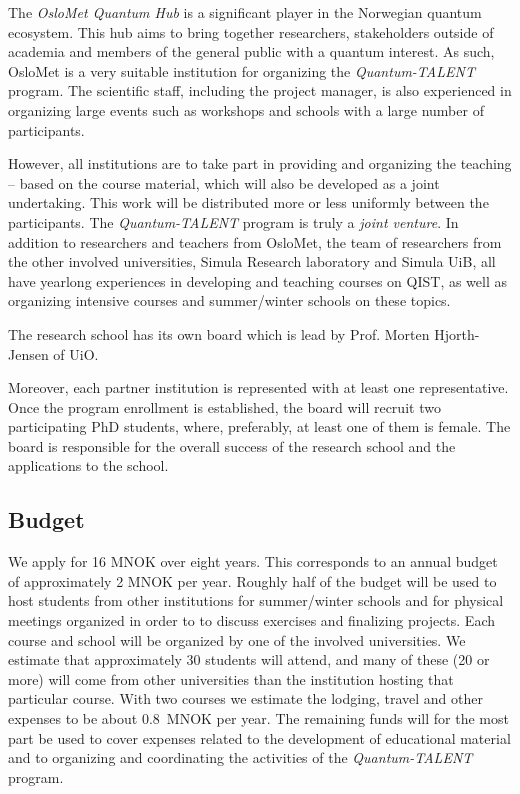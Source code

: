 \documentclass{scrreprt}
\begin{document}
The \textit{OsloMet Quantum Hub} is a significant player in the Norwegian quantum ecosystem. This hub aims to bring together researchers, stakeholders outside of academia and members of the general public with a quantum interest. As such, OsloMet is a very suitable institution for organizing the \textit{Quantum-TALENT} program. The scientific staff, including the project manager, is also experienced in organizing large events such as workshops and schools with a large number of participants.

However, all institutions are to take part in providing and organizing the teaching -- based on the course material, which will also be developed as a joint undertaking. This work will be distributed more or less uniformly between the participants. The \textit{Quantum-TALENT} program is truly a \textit{joint venture}.
In addition to researchers and teachers from OsloMet, the team of researchers from the other involved universities, Simula Research laboratory and Simula UiB, all have yearlong experiences in developing and teaching courses on QIST, as well as organizing intensive courses and summer/winter schools on these topics. 

The research school has its own board which is lead by Prof. Morten Hjorth-Jensen of UiO. 
\begin{comment}
The other board members are Profs. Sølve Selstø (OsloMet), Francesco P. Massel (USN), Konrad Tywoniuk (UiB), Are Magnus Bruaset (Simula Oslo), Carlos Cid (Simula UiB) Gabriel Balaban (Kristiania), and Jeroen Danon (NTNU). 
\end{comment}
Moreover, each partner institution is represented with at least one representative. Once the program enrollment is established, the board will recruit two participating PhD students, where, preferably, at least one of them is female.
The board 
is responsible for the overall success of the research school and the applications to the school. 

\subsection{Budget}

We apply for 16 MNOK over eight years. This corresponds to an annual budget of approximately 2 MNOK per year. Roughly half of the budget will be used to host students from other institutions for summer/winter schools and for physical meetings organized in order to to discuss exercises and finalizing projects. Each course and school will be organized by one of the involved universities. We estimate that approximately 30 students will attend, and many of these (20 or more) will come from other universities than the institution hosting that particular course. With two courses we estimate the lodging, travel and other expenses to be about 0.8~MNOK per year. The remaining funds will for the most part be used to cover expenses related to the development of educational material and to organizing and coordinating the activities of the \textit{Quantum-TALENT} program.
\end{document}
